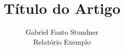 \documentclass[12pt,brazil,a4paper]{article}
\begin{document}
\title{Título do Artigo}
\author{Gabriel Fanto Stundner \\ Relatório Exemplo}
\maketitle
\end{document}
